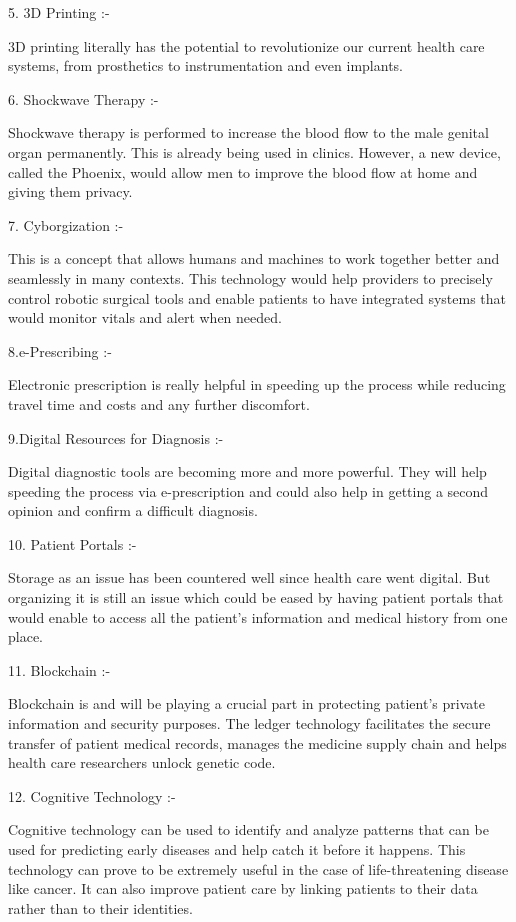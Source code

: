\documentclass[12pt]{article}
\begin{document}
\begin{normalsize}
\bigskip
\begin{large}
5. 3D Printing :-
\end{large}
3D printing literally has the potential to revolutionize our current health care systems, from prosthetics to instrumentation and even implants.

\bigskip
\begin{large}
6. Shockwave Therapy :-
\end{large}
Shockwave therapy is performed to increase the blood flow to the male genital organ permanently. This is already being used in clinics. However, a new device, called the Phoenix, would allow men to improve the blood flow at home and giving them privacy.

\bigskip
\begin{large}
7. Cyborgization :-
\end{large}
This is a concept that allows humans and machines to work together better and seamlessly in many contexts. This technology would help providers to precisely control robotic surgical tools and enable patients to have integrated systems that would monitor vitals and alert when needed.

\bigskip
\begin{large}
8.e-Prescribing :-
\end{large}
Electronic prescription is really helpful in speeding up the process while reducing travel time and costs and any further discomfort.

\bigskip
\begin{large}
9.Digital Resources for Diagnosis :-
\end{large}
Digital diagnostic tools are becoming more and more powerful. They will help speeding the process via e-prescription and could also help in getting a second opinion and confirm a difficult diagnosis.

\bigskip
\begin{large}
10. Patient Portals :-
\end{large}
Storage as an issue has been countered well since health care went digital. But organizing it is still an issue which could be eased by having patient portals that would enable to access all the patient's information and medical history from one place.

\bigskip
\begin{large}
11. Blockchain :-
\end{large}
Blockchain is and will be playing a crucial part in protecting patient's private information and security purposes. The ledger technology facilitates the secure transfer of patient medical records, manages the medicine supply chain and helps health care researchers unlock genetic code.

\bigskip
\begin{large}
12. Cognitive Technology :-
\end{large}
Cognitive technology can be used to identify and analyze patterns that can be used for predicting early diseases and help catch it before it happens. This technology can prove to be extremely useful in the case of life-threatening disease like cancer. It can also improve patient care by linking patients to their data rather than to their identities.
\end{normalsize}
\end{document}
